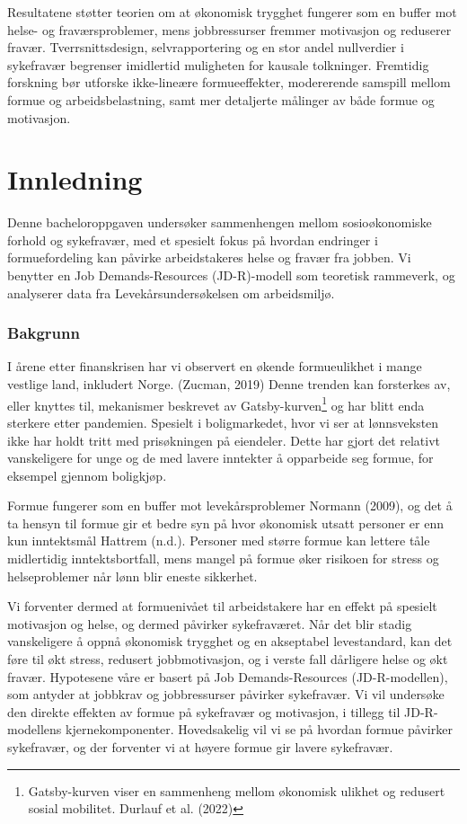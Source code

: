 \documentclass[
  12pt,
  a4paper,
  DIV=11,
  numbers=noendperiod]{scrartcl}
\begin{document}
Resultatene støtter teorien om at økonomisk trygghet fungerer som en
buffer mot helse- og fraværsproblemer, mens jobbressurser fremmer
motivasjon og reduserer fravær. Tverrsnittsdesign, selvrapportering og
en stor andel nullverdier i sykefravær begrenser imidlertid muligheten
for kausale tolkninger. Fremtidig forskning bør utforske ikke-lineære
formueeffekter, modererende samspill mellom formue og arbeidsbelastning,
samt mer detaljerte målinger av både formue og motivasjon.

\newpage

\section{Innledning}\label{innledning}

Denne bacheloroppgaven undersøker sammenhengen mellom sosioøkonomiske
forhold og sykefravær, med et spesielt fokus på hvordan endringer i
formuefordeling kan påvirke arbeidstakeres helse og fravær fra jobben.
Vi benytter en Job Demands-Resources (JD-R)-modell som teoretisk
rammeverk, og analyserer data fra Levekårsundersøkelsen om arbeidsmiljø.

\subsubsection{Bakgrunn}\label{bakgrunn}

I årene etter finanskrisen har vi observert en økende formueulikhet i
mange vestlige land, inkludert Norge. (Zucman, 2019) Denne trenden kan
forsterkes av, eller knyttes til, mekanismer beskrevet av
Gatsby-kurven\footnote{Gatsby-kurven viser en sammenheng mellom
  økonomisk ulikhet og redusert sosial mobilitet. Durlauf et al. (2022)}
og har blitt enda sterkere etter pandemien. Spesielt i boligmarkedet,
hvor vi ser at lønnsveksten ikke har holdt tritt med prisøkningen på
eiendeler. Dette har gjort det relativt vanskeligere for unge og de med
lavere inntekter å opparbeide seg formue, for eksempel gjennom
boligkjøp.

Formue fungerer som en buffer mot levekårsproblemer Normann (2009), og
det å ta hensyn til formue gir et bedre syn på hvor økonomisk utsatt
personer er enn kun inntektsmål Hattrem (n.d.). Personer med større
formue kan lettere tåle midlertidig inntektsbortfall, mens mangel på
formue øker risikoen for stress og helseproblemer når lønn blir eneste
sikkerhet.

Vi forventer dermed at formuenivået til arbeidstakere har en effekt på
spesielt motivasjon og helse, og dermed påvirker sykefraværet. Når det
blir stadig vanskeligere å oppnå økonomisk trygghet og en akseptabel
levestandard, kan det føre til økt stress, redusert jobbmotivasjon, og i
verste fall dårligere helse og økt fravær. Hypotesene våre er basert på
Job Demands-Resources (JD-R-modellen), som antyder at jobbkrav og
jobbressurser påvirker sykefravær. Vi vil undersøke den direkte effekten
av formue på sykefravær og motivasjon, i tillegg til JD-R-modellens
kjernekomponenter. Hovedsakelig vil vi se på hvordan formue påvirker
sykefravær, og der forventer vi at høyere formue gir lavere sykefravær.
\end{document}

